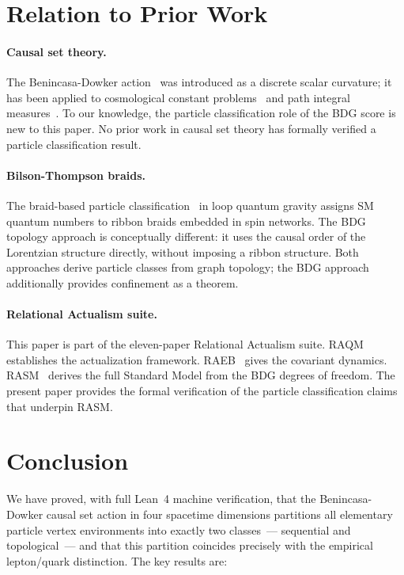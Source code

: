 \documentclass[11pt,a4paper]{article}
\begin{document}
\section{Relation to Prior Work}
\label{sec:related}

\paragraph{Causal set theory.}
The Benincasa-Dowker action~\citep{Benincasa2010} was introduced as a
discrete scalar curvature; it has been applied to cosmological
constant problems~\citep{Sorkin2005} and path integral
measures~\citep{Dowker2013}. To our knowledge, the particle
classification role of the BDG score is new to this paper.
No prior work in causal set theory has formally verified a particle
classification result.

\paragraph{Bilson-Thompson braids.}
The braid-based particle classification~\citep{BilsonThompson2005}
in loop quantum gravity assigns SM quantum numbers to ribbon braids
embedded in spin networks. The BDG topology approach is conceptually
different: it uses the causal order of the Lorentzian structure directly,
without imposing a ribbon structure. Both approaches derive particle
classes from graph topology; the BDG approach additionally provides
confinement as a theorem.

\paragraph{Relational Actualism suite.}
This paper is part of the eleven-paper Relational Actualism suite.
RAQM~\citep{Sandeman2026RAQM} establishes the actualization framework.
RAEB~\citep{Sandeman2026RAEB} gives the covariant dynamics.
RASM~\citep{Sandeman2026RASM} derives the full Standard Model from the
BDG degrees of freedom. The present paper provides the formal
verification of the particle classification claims that underpin RASM.

\section{Conclusion}
\label{sec:conclusion}

We have proved, with full Lean~4 machine verification, that the
Benincasa-Dowker causal set action in four spacetime dimensions
partitions all elementary particle vertex environments into exactly
two classes~--- sequential and topological~--- and that this partition
coincides precisely with the empirical lepton/quark distinction.
The key results are:
\end{document}
